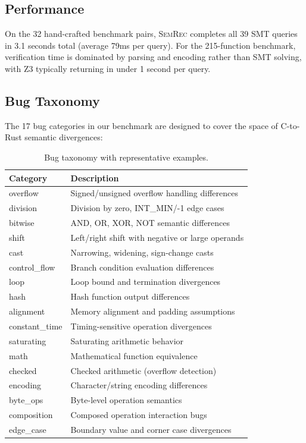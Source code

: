 \documentclass[10pt,letterpaper]{article}
\begin{document}
\subsection{Performance}

On the 32 hand-crafted benchmark pairs, \textsc{SemRec} completes all 39 SMT
queries in 3.1 seconds total (average 79ms per query). For the 215-function
benchmark, verification time is dominated by parsing and encoding rather than
SMT solving, with Z3 typically returning in under 1 second per query.

\subsection{Bug Taxonomy}
\label{sec:taxonomy}

The 17 bug categories in our benchmark are designed to cover the space of
C-to-Rust semantic divergences:

\begin{table}[t]
\centering
\caption{Bug taxonomy with representative examples.}
\label{tab:taxonomy}
\small
\begin{tabular}{@{}lp{6.5cm}@{}}
\toprule
\textbf{Category} & \textbf{Description} \\
\midrule
overflow & Signed/unsigned overflow handling differences \\
division & Division by zero, INT\_MIN/-1 edge cases \\
bitwise & AND, OR, XOR, NOT semantic differences \\
shift & Left/right shift with negative or large operands \\
cast & Narrowing, widening, sign-change casts \\
control\_flow & Branch condition evaluation differences \\
loop & Loop bound and termination divergences \\
hash & Hash function output differences \\
alignment & Memory alignment and padding assumptions \\
constant\_time & Timing-sensitive operation divergences \\
saturating & Saturating arithmetic behavior \\
math & Mathematical function equivalence \\
checked & Checked arithmetic (overflow detection) \\
encoding & Character/string encoding differences \\
byte\_ops & Byte-level operation semantics \\
composition & Composed operation interaction bugs \\
edge\_case & Boundary value and corner case divergences \\
\bottomrule
\end{tabular}
\end{table}
\end{document}

